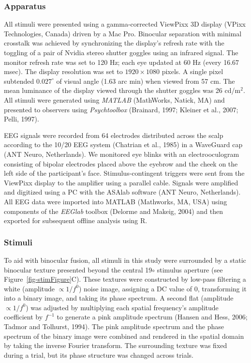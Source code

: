 \documentclass[
  12pt,
]{article}
\begin{document}
\subsubsection{Apparatus}\label{apparatus}

All stimuli were presented using a gamma-corrected ViewPixx 3D display
(VPixx Technologies, Canada) driven by a Mac Pro. Binocular separation
with minimal crosstalk was achieved by synchronizing the display's
refresh rate with the toggling of a pair of Nvidia stereo shutter
goggles using an infrared signal. The monitor refresh rate was set to
120 Hz; each eye updated at 60 Hz (every 16.67 msec). The display
resolution was set to \(1920 \times 1080\) pixels. A single pixel
subtended \(0.027^\circ\) of visual angle (1.63 arc min) when viewed
from 57 cm. The mean luminance of the display viewed through the shutter
goggles was 26 cd/m\(^2\). All stimuli were generated using
\textit{MATLAB} (MathWorks, Natick, MA) and presented to observers using
\textit{Psychtoolbox} (Brainard, 1997; Kleiner et al., 2007; Pelli,
1997).

EEG signals were recorded from 64 electrodes distributed across the
scalp according to the 10/20 EEG system (Chatrian et al., 1985) in a
WaveGuard cap (ANT Neuro, Netherlands). We monitored eye blinks with an
electrooculogram consisting of bipolar electrodes placed above the
eyebrow and the cheek on the left side of the participant's face.
Stimulus-contingent triggers were sent from the ViewPixx display to the
amplifier using a parallel cable. Signals were amplified and digitized
using a PC with the ASAlab software (ANT Neuro, Netherlands). All EEG
data were imported into MATLAB (Mathworks, MA, USA) using components of
the \textit{EEGlab} toolbox (Delorme and Makeig, 2004) and then exported
for subsequent offline analysis using R.

\subsubsection{Stimuli}\label{stimuli}

To aid with binocular fusion, all stimuli in this study were surrounded
by a static binocular texture presented beyond the central 19\(\circ\)
stimulus aperture (see Figure~\ref{fig-stimFigure}C). These textures
were constructed by low-pass filtering a white (amplitude
\(\propto 1/f^0\)) noise image, assigning a DC value of 0, transforming
it into a binary image, and taking its phase spectrum. A second flat
(amplitude \(\propto 1/f^0\)) was adjusted by multiplying each spatial
frequency's amplitude coefficient by \(f^{-1}\) to generate a pink
amplitude spectrum (Hansen and Hess, 2006; Tadmor and Tolhurst, 1994).
The pink amplitude spectrum and the phase spectrum of the binary image
were combined and rendered in the spatial domain by taking the inverse
Fourier transform. The surrounding texture was fixed during a trial, but
its phase structure was changed across trials.
\end{document}
